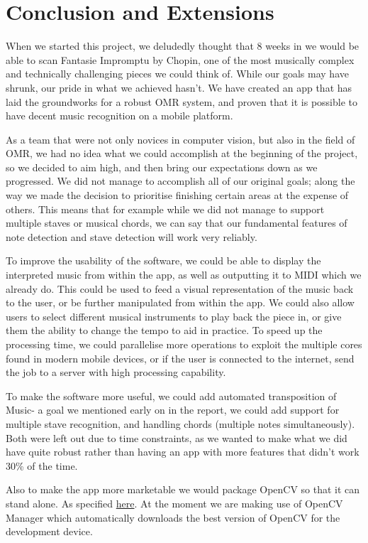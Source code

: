 \section{Conclusion and Extensions}

When we started this project, we deludedly thought that 8 weeks in we would be able to scan Fantasie Impromptu by Chopin, one of the most musically complex and technically challenging pieces we could think of. While our goals may have shrunk, our pride in what we achieved hasn't. We have created an app that has laid the groundworks for a robust OMR system, and proven that it is possible to have decent music recognition on a mobile platform. 

As a team that were not only novices in computer vision, but also in the field of OMR, we had no idea what we could accomplish at the beginning of the project, so we decided to aim high, and then bring our expectations down as we progressed. We did not manage to accomplish all of our original goals; along the way we made the decision to prioritise finishing certain areas at the expense of others. This means that for example while we did not manage to support multiple staves or musical chords, we can say that our fundamental features of note detection and stave detection will work very reliably.
 
To improve the usability of the software, we could be able to display the interpreted music from within the app, as well as outputting it to MIDI which we already do. This could be used to feed a visual representation of the music back to the user, or be further manipulated from within the app. We could also allow users to select different musical instruments to play back the piece in, or give them the ability to change the tempo to aid in practice. To speed up the processing time, we could parallelise more operations to exploit the multiple cores found in modern mobile devices, or if the user is connected to the internet, send the job to a server with high processing capability.
 
To make the software more useful, we could add automated transposition of Music- a goal we mentioned early on in the report, we could add support for multiple stave recognition, and handling chords (multiple notes simultaneously). Both were left out due to time constraints, as we wanted to make what we did have quite robust rather than having an app with more features that didn't work 30\% of the time.

Also to make the app more marketable we would package OpenCV so that it can stand alone. As specified \href{http://docs.opencv.org/doc/tutorials/introduction/android_binary_package/dev_with_OCV_on_Android.html}{here}.
At the moment we are making use of OpenCV Manager which automatically downloads the best version of OpenCV for the development device.


